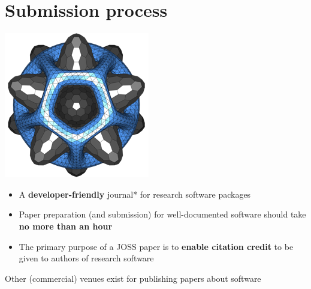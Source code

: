 \section{Submission process}

\begin{frame}
  \includegraphics[scale=0.5]{joss.png}      
\vspace{1cm}
\begin{itemize}
    \item A \textbf{developer-friendly} journal* for research software
packages
    \item Paper preparation (and submission) for well-documented
software should take \textbf{no more than an hour}
\item The primary purpose of a JOSS paper is to \textbf{enable citation
credit} to be given to authors of research software
\end{itemize}

\vspace{2cm}

{\tiny * Other (commercial) venues exist for publishing papers about software}
\end{frame}

